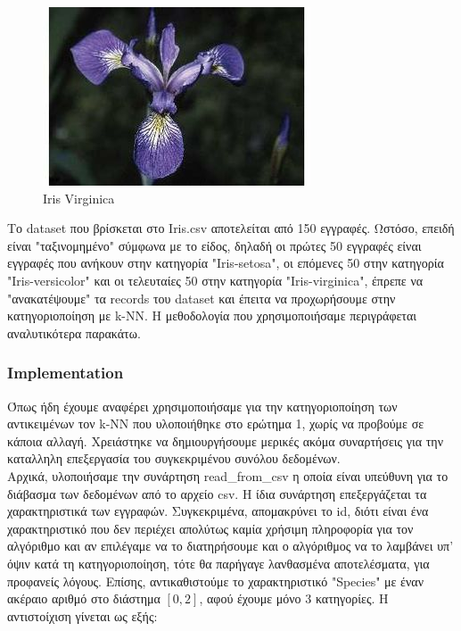 \documentclass[12pt]{article}
\newenvironment{matlab}
	{\begin{figure}[H]\centering\captionsetup{justification=centering}}
	{\end{figure}}
\begin{document}
\begin{matlab}
	\includegraphics[scale=0.8]{images/iris_virginica.jpg}
	\caption{Iris Virginica}
\end{matlab}

Το dataset που βρίσκεται στο Iris.csv αποτελείται από 150 εγγραφές. Ωστόσο, επειδή είναι "ταξινομημένο" σύμφωνα με το είδος, δηλαδή οι πρώτες 50 εγγραφές είναι εγγραφές που ανήκουν στην κατηγορία "Iris-setosa", οι επόμενες 50 στην κατηγορία "Iris-versicolor" και οι τελευταίες 50 στην κατηγορία "Iris-virginica", έπρεπε να "ανακατέψουμε" τα records του dataset και έπειτα να προχωρήσουμε στην κατηγοριοποίηση με k-NN. Η μεθοδολογία που χρησιμοποιήσαμε περιγράφεται αναλυτικότερα παρακάτω. \\ 

\subsubsection*{Implementation}

Όπως ήδη έχουμε αναφέρει χρησιμοποιήσαμε για την κατηγοριοποίηση των αντικειμένων τον k-NN που υλοποιήθηκε στο ερώτημα 1, χωρίς να προβούμε σε κάποια αλλαγή. Χρειάστηκε να δημιουργήσουμε μερικές ακόμα συναρτήσεις για την καταλληλη επεξεργασία του συγκεκριμένου συνόλου δεδομένων. \\

Αρχικά, υλοποιήσαμε την συνάρτηση read\_from\_csv η οποία είναι υπεύθυνη για το διάβασμα των δεδομένων από το αρχείο csv. Η ίδια συνάρτηση επεξεργάζεται τα χαρακτηριστικά των εγγραφών. Συγκεκριμένα, απομακρύνει το id, διότι είναι ένα χαρακτηριστικό που δεν περιέχει απολύτως καμία χρήσιμη πληροφορία για τον αλγόριθμο και αν επιλέγαμε να το διατηρήσουμε και ο αλγόριθμος να το λαμβάνει υπ' όψιν κατά τη κατηγοριοποίηση, τότε θα παρήγαγε λανθασμένα αποτελέσματα, για προφανείς λόγους. Επίσης, αντικαθιστούμε το χαρακτηριστικό "Species" με έναν ακέραιο αριθμό στο διάστημα \([0,2]\), αφού έχουμε μόνο 3 κατηγορίες. Η αντιστοίχιση γίνεται ως εξής: 
\end{document}
